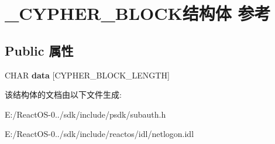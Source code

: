 \hypertarget{struct___c_y_p_h_e_r___b_l_o_c_k}{}\section{\+\_\+\+C\+Y\+P\+H\+E\+R\+\_\+\+B\+L\+O\+C\+K结构体 参考}
\label{struct___c_y_p_h_e_r___b_l_o_c_k}
\subsection*{Public 属性}
\begin{DoxyCompactItemize}
\item 
\mbox{\label{struct___c_y_p_h_e_r___b_l_o_c_k_ae390314c9844a9bf05ca506c7a0cc608}} 
C\+H\+AR {\bfseries data} \mbox{[}C\+Y\+P\+H\+E\+R\+\_\+\+B\+L\+O\+C\+K\+\_\+\+L\+E\+N\+G\+TH\mbox{]}
\end{DoxyCompactItemize}


该结构体的文档由以下文件生成\+:\begin{DoxyCompactItemize}
\item 
E\+:/\+React\+O\+S-\/0../sdk/include/psdk/subauth.\+h\item 
E\+:/\+React\+O\+S-\/0../sdk/include/reactos/idl/netlogon.\+idl\end{DoxyCompactItemize}
